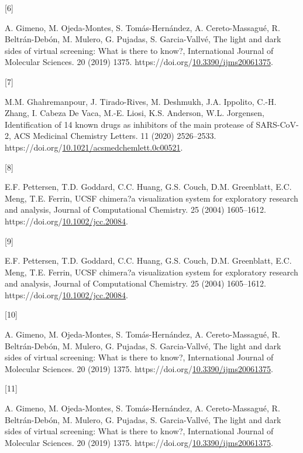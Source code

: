 \documentclass[
]{article}
\newlength{\cslhangindent}
\newlength{\csllabelwidth}
\newlength{\cslentryspacingunit} %
\newenvironment{CSLReferences}[2] %
 {%
  \setlength{\parindent}{0pt}
  \ifodd #1
  \let\oldpar\par
  \def\par{\hangindent=\cslhangindent\oldpar}
  \fi
  \setlength{\parskip}{#2\cslentryspacingunit}
 }%
 {}
\newcommand{\CSLLeftMargin}[1]{\parbox[t]{\csllabelwidth}{#1}}
\newcommand{\CSLRightInline}[1]{\parbox[t]{\linewidth - \csllabelwidth}{#1}\break}
\begin{document}
\begin{CSLReferences}{0}{0}
\leavevmode{}%
\CSLLeftMargin{{[}6{]} }%
\CSLRightInline{A. Gimeno, M. Ojeda-Montes, S. Tomás-Hernández, A.
Cereto-Massagué, R. Beltrán-Debón, M. Mulero, G. Pujadas, S.
Garcia-Vallvé, The light and dark sides of virtual screening: What is
there to know?, International Journal of Molecular Sciences. 20 (2019)
1375.
https://doi.org/\href{https://doi.org/10.3390/ijms20061375}{10.3390/ijms20061375}.}

\leavevmode{}%
\CSLLeftMargin{{[}7{]} }%
\CSLRightInline{M.M. Ghahremanpour, J. Tirado-Rives, M. Deshmukh, J.A.
Ippolito, C.-H. Zhang, I. Cabeza De Vaca, M.-E. Liosi, K.S. Anderson,
W.L. Jorgensen, Identification of 14 known drugs as inhibitors of the
main protease of SARS-CoV-2, ACS Medicinal Chemistry Letters. 11 (2020)
2526--2533.
https://doi.org/\href{https://doi.org/10.1021/acsmedchemlett.0c00521}{10.1021/acsmedchemlett.0c00521}.}

\leavevmode{}%
\CSLLeftMargin{{[}8{]} }%
\CSLRightInline{E.F. Pettersen, T.D. Goddard, C.C. Huang, G.S. Couch,
D.M. Greenblatt, E.C. Meng, T.E. Ferrin, UCSF chimera?a visualization
system for exploratory research and analysis, Journal of Computational
Chemistry. 25 (2004) 1605--1612.
https://doi.org/\href{https://doi.org/10.1002/jcc.20084}{10.1002/jcc.20084}.}

\leavevmode{}%
\CSLLeftMargin{{[}9{]} }%
\CSLRightInline{E.F. Pettersen, T.D. Goddard, C.C. Huang, G.S. Couch,
D.M. Greenblatt, E.C. Meng, T.E. Ferrin, UCSF chimera?a visualization
system for exploratory research and analysis, Journal of Computational
Chemistry. 25 (2004) 1605--1612.
https://doi.org/\href{https://doi.org/10.1002/jcc.20084}{10.1002/jcc.20084}.}

\leavevmode{}%
\CSLLeftMargin{{[}10{]} }%
\CSLRightInline{A. Gimeno, M. Ojeda-Montes, S. Tomás-Hernández, A.
Cereto-Massagué, R. Beltrán-Debón, M. Mulero, G. Pujadas, S.
Garcia-Vallvé, The light and dark sides of virtual screening: What is
there to know?, International Journal of Molecular Sciences. 20 (2019)
1375.
https://doi.org/\href{https://doi.org/10.3390/ijms20061375}{10.3390/ijms20061375}.}

\leavevmode{}%
\CSLLeftMargin{{[}11{]} }%
\CSLRightInline{A. Gimeno, M. Ojeda-Montes, S. Tomás-Hernández, A.
Cereto-Massagué, R. Beltrán-Debón, M. Mulero, G. Pujadas, S.
Garcia-Vallvé, The light and dark sides of virtual screening: What is
there to know?, International Journal of Molecular Sciences. 20 (2019)
1375.
https://doi.org/\href{https://doi.org/10.3390/ijms20061375}{10.3390/ijms20061375}.}


\end{CSLReferences}
\end{document}
